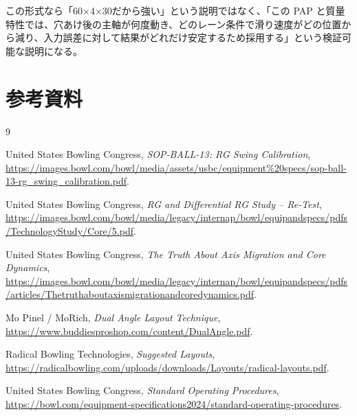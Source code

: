 \documentclass[11pt,a4paper]{article}
\begin{document}
この形式なら「60×4×30だから強い」という説明ではなく、「この PAP と質量特性では、穴あけ後の主軸が何度動き、どのレーン条件で滑り速度がどの位置から減り、入力誤差に対して結果がどれだけ安定するため採用する」という検証可能な説明になる。

\section*{参考資料}
\begin{thebibliography}{9}

United States Bowling Congress,
\textit{SOP-BALL-13: RG Swing Calibration},
\url{https://images.bowl.com/bowl/media/assets/usbc/equipment%20specs/sop-ball-13-rg_swing_calibration.pdf}.

United States Bowling Congress,
\textit{RG and Differential RG Study -- Re-Test},
\url{https://images.bowl.com/bowl/media/legacy/internap/bowl/equipandspecs/pdfs/TechnologyStudy/Core/5.pdf}.

United States Bowling Congress,
\textit{The Truth About Axis Migration and Core Dynamics},
\url{https://images.bowl.com/bowl/media/legacy/internap/bowl/equipandspecs/pdfs/articles/Thetruthaboutaxismigrationandcoredynamics.pdf}.

Mo Pinel / MoRich,
\textit{Dual Angle Layout Technique},
\url{https://www.buddiesproshop.com/content/DualAngle.pdf}.

Radical Bowling Technologies,
\textit{Suggested Layouts},
\url{https://radicalbowling.com/uploads/downloads/Layouts/radical-layouts.pdf}.

United States Bowling Congress,
\textit{Standard Operating Procedures},
\url{https://bowl.com/equipment-specifications2024/standard-operating-procedures}.

\end{thebibliography}
\end{document}
